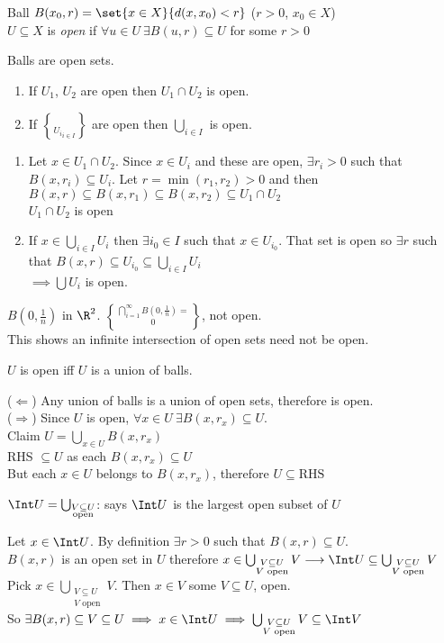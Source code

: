 Ball $B(x_0,r)=\set{x\in X}{d(x,x_0)<r}$ ($r>0$, $x_0\in X$) \\
$U\subseteq X$ is \emph{open} if $\forall u\in U~\exists B(u,r)\subseteq U$ for some $r>0$

\prop Balls are open sets.

\prop \begin{enumerate}
\item If $U_1$, $U_2$ are open then $U_1\cap U_2$ is open.
\item If $\brace{U_i}_{i\in I}$ are open then $\bigcup_{i\in I}$ is open.
\end{enumerate}
\pf \begin{enumerate}
\item Let $x\in U_1\cap U_2$.  Since $x\in U_i$ and these are open, $\exists r_i>0$ such that $B(x,r_i)\subseteq U_i$.  Let $r=\min(r_1,r_2)>0$ and then $B(x,r)\subseteq B(x,r_1)\subseteq B(x,r_2)\subseteq U_1\cap U_2$ \\
$U_1\cap U_2$ is open
\item If $x\in\bigcup_{i\in I}U_i$ then $\exists i_0\in I$ such that $x\in U_{i_0}$.  That set is open so $\exists r$ such that $B(x,r)\subseteq U_{i_0}\subseteq\bigcup_{i\in I}U_i$ \\
$\implies \bigcup U_i$ is open.
\end{enumerate}

\ex $B(0,\frac1n)$ in $\R^2$.  $\bigcap_{i=1}^\infty B(0,\frac1n)=\brace0$, not open. \\
This shows an infinite intersection of open sets need not be open.

\prop $U$ is open iff $U$ is a union of balls.

\pf ($\Longleftarrow$) Any union of balls is a union of open sets, therefore is open. \\
($\Longrightarrow$) Since $U$ is open, $\forall x\in U~\exists B(x,r_x)\subseteq U$. \\
Claim $U=\bigcup_{x\in U}B(x,r_x)$ \\
RHS $\subseteq U$ as each $B(x,r_x)\subseteq U$ \\
But each $x\in U$ belongs to $B(x,r_x)$, therefore $U\subseteq\text{RHS}$

\prop $\Int U=\bigcup_{\substack{V\subseteq U\\\text{open}}}$: says $\Int U$ is the largest open subset of $U$

\pf Let $x\in\Int U$.  By definition $\exists r>0$ such that $B(x,r)\subseteq U$. \\
$B(x,r)$ is an open set in $U$ therefore $x\in\bigcup_{\substack{V\subseteq U\\\text{$V$ open}}} V \longrightarrow \Int U\subseteq\bigcup_{\substack{V\subseteq U\\\text{$V$ open}}} V$ \\
Pick $x\in\bigcup_{\substack{V\subseteq U\\\text{$V$ open}}} V$.  Then $x\in V$ some $V\subseteq U$, open. \\
So $\exists B(x,r)\subseteq V\subseteq U \implies x\in\Int U\implies\bigcup_{\substack{V\subseteq U\\\text{$V$ open}}} V \subseteq \Int V$

